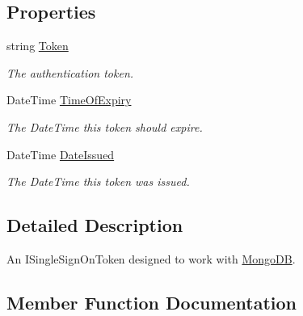 \subsection*{Properties}
\begin{DoxyCompactItemize}
\item 
string \hyperlink{classCqrs_1_1Mongo_1_1Repositories_1_1Authentication_1_1SingleSignOnToken_a48105fdf07433e74837cdc922d0b2d1f_a48105fdf07433e74837cdc922d0b2d1f}{Token}
\begin{DoxyCompactList}\small\item\em The authentication token. \end{DoxyCompactList}\item 
Date\+Time \hyperlink{classCqrs_1_1Mongo_1_1Repositories_1_1Authentication_1_1SingleSignOnToken_a8f4e70b3498d48ae914f02890750d096_a8f4e70b3498d48ae914f02890750d096}{Time\+Of\+Expiry}
\begin{DoxyCompactList}\small\item\em The Date\+Time this token should expire. \end{DoxyCompactList}\item 
Date\+Time \hyperlink{classCqrs_1_1Mongo_1_1Repositories_1_1Authentication_1_1SingleSignOnToken_a92a25011e2a4a44e5fb99c4ee9f75f4d_a92a25011e2a4a44e5fb99c4ee9f75f4d}{Date\+Issued}
\begin{DoxyCompactList}\small\item\em The Date\+Time this token was issued. \end{DoxyCompactList}\end{DoxyCompactItemize}


\subsection{Detailed Description}
An I\+Single\+Sign\+On\+Token designed to work with \hyperlink{namespaceCqrs_1_1MongoDB}{Mongo\+DB}. 



\subsection{Member Function Documentation}
\mbox{\label{classCqrs_1_1Mongo_1_1Repositories_1_1Authentication_1_1SingleSignOnToken_ab0ad6b0a6065a2553a093214e5a033b5_ab0ad6b0a6065a2553a093214e5a033b5}} 
